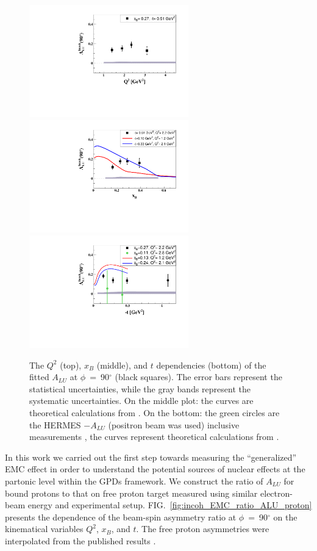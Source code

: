 \documentclass[twocolumn,nofootinbib,showpacs,prl,superscriptaddress,secnumarabic,amssymb,nobibnotes,aps,floatfix]{revtex4}
\begin{document}
\begin{figure}[tb]
\includegraphics[width=6.9cm]{figs/ALU_90_p_vs_Q2_shortscenrario.pdf}
\includegraphics[width=6.9cm]{figs/ALU_90_p_vs_x_shortscenrario.pdf}
\includegraphics[width=6.9cm]{figs/ALU_90_p_vs_t_shortscenrario.pdf}
\caption{The $Q^{2}$ (top), $x_{B}$ (middle), and $t$ dependencies (bottom) of
   the fitted $A_{LU}$ at $\phi$~=~90$^{\circ}$ (black squares). The error bars 
   represent the statistical uncertainties, while the gray bands represent the 
   systematic uncertainties. On the middle plot: the curves are theoretical 
   calculations from \cite{simonetta_2}. On the bottom: the green circles are 
   the HERMES $-A_{LU}$ (positron beam was used) inclusive measurements 
   \cite{Airapetian}, the curves represent theoretical calculations from 
   \cite{simonetta_2}. } \label{fig:alu90}
\end{figure}

In this work we carried out the first step towards measuring the 
``generalized'' EMC effect in order to understand the potential sources of 
nuclear effects at the partonic level within the GPDs framework. We construct 
the ratio of $A_{LU}$ for bound protons to that on free proton target measured 
using similar electron-beam energy and experimental setup.  
FIG.~\ref{fig:incoh_EMC_ratio_ALU_proton} presents the dependence of the 
beam-spin asymmetry ratio at $\phi$~=~90$^{\circ}$ on the kinematical variables 
$Q^2$, $x_B$, and $t$. The free proton asymmetries were interpolated from the 
published results \cite{Girod:2007aa}.   
\end{document}
